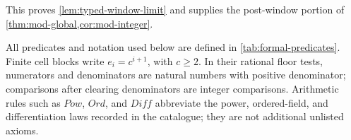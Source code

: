 \documentclass[11pt,reqno]{amsart}
\makeatletter
\newlength{\CenteredRowHeight}
\newcommand{\CenteredTableWidths}[6]{%
  \def\CenteredWidthA{#1}\def\CenteredWidthB{#2}%
  \def\CenteredWidthC{#3}\def\CenteredWidthD{#4}%
  \def\CenteredWidthE{#5}\def\CenteredWidthF{#6}}
\newcommand{\CenteredMeasure}[3]{%
  \global\setbox#1=\hbox{\parbox[c]{#2}{%
    \centering\setlength{\parindent}{0pt}#3\par}}%
  \ifdim\dimexpr\ht#1+\dp#1\relax>\CenteredRowHeight
    \global\CenteredRowHeight=\dimexpr\ht#1+\dp#1\relax
  \fi}
\newcommand{\CenteredRender}[2]{%
  \parbox[c][\CenteredRowHeight][c]{#2}{%
    \centering\setlength{\parindent}{0pt}\usebox{#1}\par}}
\newcommand{\CenteredRowFour}[5][0pt]{%
  \global\CenteredRowHeight=0pt\relax%
  \CenteredMeasure{\CenteredBoxA}{\CenteredWidthA}{#2}%
  \CenteredMeasure{\CenteredBoxB}{\CenteredWidthB}{#3}%
  \CenteredMeasure{\CenteredBoxC}{\CenteredWidthC}{#4}%
  \CenteredMeasure{\CenteredBoxD}{\CenteredWidthD}{#5}%
  \global\advance\CenteredRowHeight by \dimexpr 2pt+#1\relax%
  \CenteredRender{\CenteredBoxA}{\CenteredWidthA} &%
  \CenteredRender{\CenteredBoxB}{\CenteredWidthB} &%
  \CenteredRender{\CenteredBoxC}{\CenteredWidthC} &%
  \CenteredRender{\CenteredBoxD}{\CenteredWidthD}}
\theoremstyle{blueplain}
\newcounter{type}
\newcommand{\defref}[1]{\hyperref[#1]{Definition~\ref*{#1}}}
\providecommand{\comma}{\allowbreak,\,}
\numberwithin{equation}{section}
\DeclareRobustCommand{\defref}[1]{%
  \hyperlink{def:#1}{\ensuremath{\csname PredicateName@#1\endcsname}}}
\newcommand{\proofitem}[2]{\hypertarget{proof:#1}{#2}}
\DeclareRobustCommand{\proofref}[2]{\hyperlink{proof:#1}{\ensuremath{#2}}}
\def\defref#1{#1}%
\def\proofref#1#2{#2}%
\def\hyperlink#1#2{#2}}
\newcommand{\stepitem}[3]{\hypertarget{proofstep:#1:#2}{#3}}
\DeclareRobustCommand{\stepref}[2]{%
  \hyperlink{proofstep:#1:#2}{\ensuremath{\csname ProofBlockName@#1\endcsname(#2)}}}
\makeatother
\begin{document}
This proves \cref{lem:typed-window-limit} and supplies the post-window
portion of \cref{thm:mod-global,cor:mod-integer}.




All predicates and notation used below are defined in \cref{tab:formal-predicates}.
Finite cell blocks write \(e_i=c^{i+1}\), with \(c\ge2\).
In their rational floor tests, numerators and denominators are natural
numbers with positive denominator; comparisons after clearing denominators
are integer comparisons. Arithmetic rules such as \(\defref{Pow}\),
\(\defref{Ord}\), and \(\defref{Diff}\) abbreviate the power,
ordered-field, and differentiation laws recorded in the catalogue;
they are not additional unlisted axioms.

\begingroup
\scriptsize
\CenteredTableWidths{1.8cm}{0.6cm}{8.8cm}{4.0cm}{1pt}{1pt}
\end{document}
